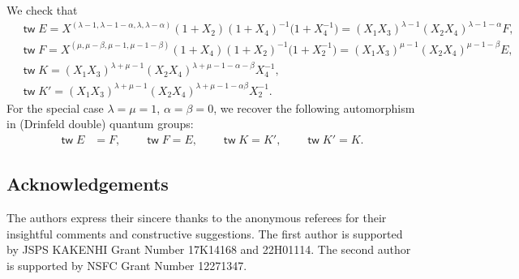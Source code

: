 \documentclass[10pt,a4paper]{amsart}
\renewcommand{\tilde}[1]{\widetilde{#1}}
\newcommand{\opname}[1]{\operatorname{\mathsf{#1}}}
\newcommand{\tw}{{\tilde{w}}}
\renewcommand{\tw}{\opname{tw}}
\renewcommand{\tw}{\opname{tw}}
\numberwithin{equation}{section}
\begin{document}
\begin{Example}
We check that
\begin{align*}
&\tw E =X^{(\lambda-1,\lambda-1-\alpha,\lambda,\lambda-\alpha)}(1+X_{2})(1+X_{4})^{-1}\big(1+X_{4}^{-1}\big)=(X_{1}X_{3})^{\lambda-1}(X_{2}X_{4})^{\lambda-1-\alpha}F,\\
&\tw F =X^{(\mu,\mu-\beta,\mu-1,\mu-1-\beta)}(1+X_{4})(1+X_{2})^{-1}\big(1+X_{2}^{-1}\big)=(X_{1}X_{3})^{\mu-1}(X_{2}X_{4})^{\mu-1-\beta}E,\\
&\tw K =(X_{1}X_{3})^{\lambda+\mu-1}(X_{2}X_{4})^{\lambda+\mu-1-\alpha-\beta}X_{4}^{-1},\\
&\tw K' =(X_{1}X_{3})^{\lambda+\mu-1}(X_{2}X_{4})^{\lambda+\mu-1-\alpha\beta}X_{2}^{-1}.
\end{align*}
For the special case $\lambda=\mu=1$, $\alpha=\beta=0$, we recover
the following automorphism in (Drinfeld double) quantum groups:
\begin{align*}
\tw E & =F,\qquad
\tw F =E,\qquad
\tw K =K',\qquad
\tw K' =K.
\end{align*}
\end{Example}

\subsection*{Acknowledgements}

The authors express their sincere thanks to the anonymous referees for their insightful comments and constructive suggestions. The first author is supported by JSPS KAKENHI Grant Number 17K14168 and 22H01114. The second author is supported by NSFC Grant Number 12271347.

\end{document}
